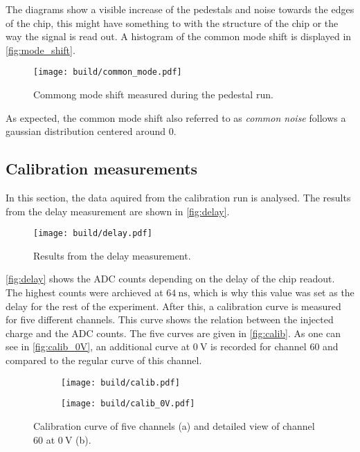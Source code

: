The diagrams show a visible increase of the pedestals and noise towards the edges of the chip,
this might have something to with the structure of the chip or the way the signal is read out.
A histogram of the common mode shift is displayed in \autoref{fig:mode_shift}.

\begin{figure}[H]
  \centering
  \texttt{[image: build/common\_mode.pdf]}
  \caption{Commong mode shift measured during the pedestal run.}
  \label{fig:mode_shift}
\end{figure}

As expected, the common mode shift also referred to as \textit{common noise} follows a gaussian
distribution centered around $0$.

\subsection{Calibration measurements}

In this section, the data aquired from the calibration run is analysed. The results from the delay measurement
are shown in \autoref{fig:delay}.

\begin{figure}[H]
  \centering
  \texttt{[image: build/delay.pdf]}
  \caption{Results from the delay measurement.}
  \label{fig:delay}
\end{figure}

\autoref{fig:delay} shows the ADC counts depending on the delay of the chip readout. The highest
counts were archieved at $\qty{64}{\nano\second}$, which is why this value was set as the
delay for the rest of the experiment.
After this, a calibration curve is measured for five different channels. This curve shows
the relation between the injected charge and the ADC counts. The five curves are given
in \autoref{fig:calib}.
As one can see in \autoref{fig:calib_0V}, an additional curve at $\qty{0}{\volt}$ is recorded for channel $60$
and compared to the regular curve of this channel.

\begin{figure}[H]
  \centering
    \begin{subfigure}{0.45\textwidth}
      \texttt{[image: build/calib.pdf]}
      \caption{}
      \label{fig:calib}
    \end{subfigure}
    \begin{subfigure}{0.45\textwidth}
      \texttt{[image: build/calib\_0V.pdf]}
      \caption{}
      \label{fig:calib_0V}
    \end{subfigure} 
  \caption{Calibration curve of five channels (a) and detailed view of channel $60$ at $\qty{0}{\volt}$ (b).}
  \label{fig:calib_run}
\end{figure}

